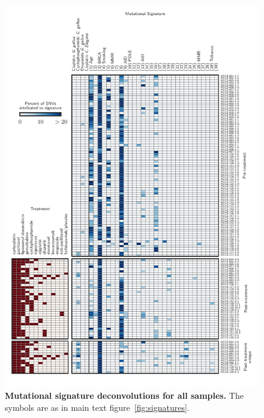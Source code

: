 \begin{figure}
\centering
\includegraphics[scale=1.0]{figures/supplementary_signatures.pdf}
\caption{\textbf{Mutational signature deconvolutions for all samples.} The symbols are as in main text figure~\ref{fig:signatures}.}
\label{fig:supp_signatures}
\end{figure}

